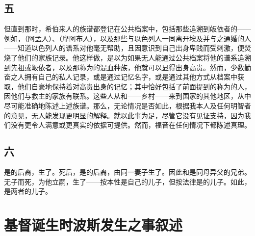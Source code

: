 
\subsection{五}

但直到那时，希伯来人的族谱都登记在公共档案中，包括那些追溯到皈依者的——例如，（阿孟人）、（摩阿布人），以及那些与以色列人一同离开埃及并与之通婚的人——知道以色列人的谱系对他毫无帮助，且因意识到自己出身卑贱而受刺激，便焚烧了他们的家族记录。他这样做，是以为如果无人能通过公共档案将他的谱系追溯到先祖或皈依者，以及那称为的混血种族，他就可以显得出身高贵。然而，少数勤奋之人拥有自己的私人记录，或是通过记忆名字，或是通过其他方式从档案中获取，他们自豪地保持着对高贵出身的记忆；其中恰好包括了前面提到的称为的人，因他们与救主的家族有联系。这些人从和——乡村——来到国家的其他地区，从中尽可能准确地陈述上述族谱。那么，无论情况是否如此，根据我本人及任何明智者的意见，无人能发现更明显的解释。就以此事为足，尽管它没有见证支持，因为我们没有更令人满意或更真实的依据可提供。然而，福音在任何情况下都陈述真理。\par


\subsection{六}

是的后裔，生了。死后，是的后裔，由同一妻子生了。因此和是同母异父的兄弟。无子而死，为他立嗣，生了——按本性是自己的儿子，但按法律是的儿子。如此，是两者的儿子。\par


\section{基督诞生时波斯发生之事叙述}

